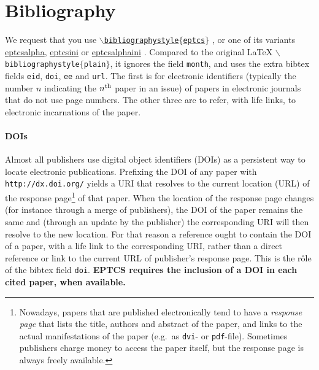 \documentclass[submission,copyright,creativecommons]{eptcs}
\begin{document}
\section{Bibliography}

We request that you use
\href{http://eptcs.web.cse.unsw.edu.au/eptcs.bst}
{\tt $\backslash$bibliographystyle$\{$eptcs$\}$}
\cite{bibliographystylewebpage}, or one of its variants
\href{http://eptcs.web.cse.unsw.edu.au/eptcsalpha.bst}{eptcsalpha},
\href{http://eptcs.web.cse.unsw.edu.au/eptcsini.bst}{eptcsini} or
\href{http://eptcs.web.cse.unsw.edu.au/eptcsalphaini.bst}{eptcsalphaini}
\cite{bibliographystylewebpage}. Compared to the original {\LaTeX}
{\tt $\backslash$biblio\-graphystyle$\{$plain$\}$},
it ignores the field {\tt month}, and uses the extra
bibtex fields {\tt eid}, {\tt doi}, {\tt ee} and {\tt url}.
The first is for electronic identifiers (typically the number $n$
indicating the $n^{\rm th}$ paper in an issue) of papers in electronic
journals that do not use page numbers. The other three are to refer,
with life links, to electronic incarnations of the paper.

\paragraph{DOIs}

Almost all publishers use digital object identifiers (DOIs) as a
persistent way to locate electronic publications. Prefixing the DOI of
any paper with {\tt http://dx.doi.org/} yields a URI that resolves to the
current location (URL) of the response page\footnote{Nowadays, papers
  that are published electronically tend
  to have a \emph{response page} that lists the title, authors and
  abstract of the paper, and links to the actual manifestations of
  the paper (e.g.\ as {\tt dvi}- or {\tt pdf}-file). Sometimes
  publishers charge money to access the paper itself, but the response
  page is always freely available.}
of that paper. When the location of the response page changes (for
instance through a merge of publishers), the DOI of the paper remains
the same and (through an update by the publisher) the corresponding
URI will then resolve to the new location. For that reason a reference
ought to contain the DOI of a paper, with a life link to the corresponding
URI, rather than a direct reference or link to the current URL of
publisher's response page. This is the r\^ole of the bibtex field {\tt doi}.
{\bf EPTCS requires the inclusion of a DOI in each cited paper, when available.}
\end{document}
